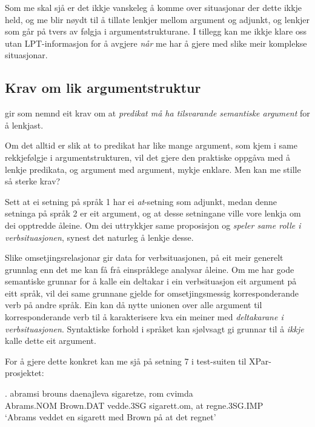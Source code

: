 \documentclass[11pt,a4paper,oneside,draft]{book}
\begin{document}
Som me skal sjå er det ikkje vanskeleg å komme over situasjonar der
dette ikkje held, og me blir nøydt til å tillate lenkjer mellom
argument og adjunkt, og lenkjer som går på tvers av følgja i
argumentstrukturane. I tillegg kan me ikkje klare oss utan
LPT-informasjon for å avgjere \emph{når} me har å gjere med slike meir
komplekse situasjonar. 
\subsection{Krav om lik argumentstruktur}
\label{sec-3.6.1}

\label{SEC:lik-argstr}

\citet{thunes2003eal} gir som nemnd eit krav om at \emph{predikat må ha tilsvarande semantiske argument} for å lenkjast.

Om det alltid er slik at to predikat har like mange argument, som kjem i
same rekkjefølgje i argumentstrukturen, vil det gjere den praktiske
oppgåva med å lenkje predikata, og argument med argument, mykje
enklare. Men kan me stille så sterke krav?

Sett at ei setning på språk 1 har ei \emph{at}-setning som adjunkt, medan
denne setninga på språk 2 er eit argument, og at desse setningane
ville vore lenkja om dei opptredde åleine. Om dei uttrykkjer same
proposisjon og \emph{speler same rolle i verbsituasjonen}, synest det
naturleg å lenkje desse.

Slike omsetjingsrelasjonar gir data for verbsituasjonen, på eit meir
generelt grunnlag enn det me kan få frå einspråklege analysar
åleine. Om me har gode semantiske grunnar for å kalle ein deltakar i
ein verbsituasjon eit argument på eitt språk, vil dei same grunnane
gjelde for omsetjingsmessig korresponderande verb på andre språk. Ein
kan då nytte unionen over alle argument til korresponderande verb til
å karakterisere kva ein meiner med \emph{deltakarane i verbsituasjonen}. Syntaktiske forhold i språket kan sjølvsagt gi
grunnar til å \emph{ikkje} kalle dette eit argument.

For å gjere dette konkret kan me sjå på setning 7 i test-suiten til
XPar-prosjektet:

\exg.  abramsi brouns       daenajleva sigaretze, rom cvimda \\
      Abrams.NOM Brown.DAT vedde.3SG sigarett.om, at  regne.3SG.IMP \\
     `Abrams veddet en sigarett med Brown på at det regnet' 
\end{document}
